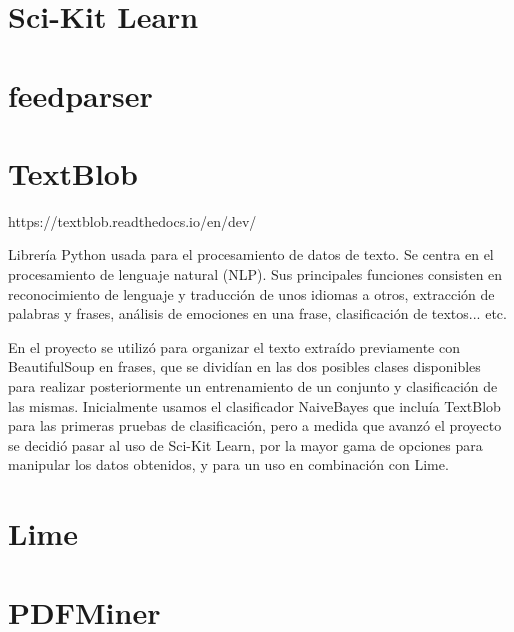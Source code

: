 \section{Sci-Kit Learn}



\section{feedparser}

\section{TextBlob}

https://textblob.readthedocs.io/en/dev/

Librería Python usada para el procesamiento de datos de texto. Se centra en el procesamiento de lenguaje natural (NLP). Sus principales funciones consisten en reconocimiento de lenguaje y traducción de unos idiomas a otros, extracción de palabras y frases, análisis de emociones en una frase, clasificación de textos... etc.

En el proyecto se utilizó para organizar el texto extraído previamente con BeautifulSoup en frases, que se dividían en las dos posibles clases disponibles para realizar posteriormente un entrenamiento de un conjunto y clasificación de las mismas. Inicialmente usamos el clasificador NaiveBayes que incluía TextBlob para las primeras pruebas de clasificación, pero a medida que avanzó el proyecto se decidió pasar al uso de Sci-Kit Learn, por la mayor gama de opciones para manipular los datos obtenidos, y para un uso en combinación con Lime.

\section{Lime}

\section{PDFMiner}